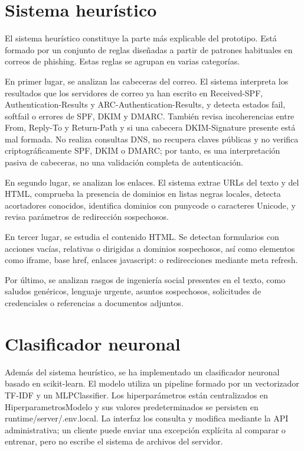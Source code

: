 \documentclass[11pt,a4paper,oneside]{report}
\begin{document}
\section{Sistema heurístico}

El sistema heurístico constituye la parte más explicable del prototipo. Está formado por un conjunto de reglas diseñadas a partir de patrones habituales en correos de phishing. Estas reglas se agrupan en varias categorías.

En primer lugar, se analizan las cabeceras del correo. El sistema interpreta los resultados que los servidores de correo ya han escrito en Received-SPF, Authentication-Results y ARC-Authentication-Results, y detecta estados fail, softfail o errores de SPF, DKIM y DMARC. También revisa incoherencias entre From, Reply-To y Return-Path y si una cabecera DKIM-Signature presente está mal formada. No realiza consultas DNS, no recupera claves públicas y no verifica criptográficamente SPF, DKIM o DMARC; por tanto, es una interpretación pasiva de cabeceras, no una validación completa de autenticación.

En segundo lugar, se analizan los enlaces. El sistema extrae URLs del texto y del HTML, comprueba la presencia de dominios en listas negras locales, detecta acortadores conocidos, identifica dominios con punycode o caracteres Unicode, y revisa parámetros de redirección sospechosos.

En tercer lugar, se estudia el contenido HTML. Se detectan formularios con acciones vacías, relativas o dirigidas a dominios sospechosos, así como elementos como iframe, base href, enlaces javascript: o redirecciones mediante meta refresh.

Por último, se analizan rasgos de ingeniería social presentes en el texto, como saludos genéricos, lenguaje urgente, asuntos sospechosos, solicitudes de credenciales o referencias a documentos adjuntos.

\section{Clasificador neuronal}

Además del sistema heurístico, se ha implementado un clasificador neuronal basado en scikit-learn. El modelo utiliza un pipeline formado por un vectorizador TF-IDF y un MLPClassifier. Los hiperparámetros están centralizados en HiperparametrosModelo y sus valores predeterminados se persisten en runtime/server/.env.local. La interfaz los consulta y modifica mediante la API administrativa; un cliente puede enviar una excepción explícita al comparar o entrenar, pero no escribe el sistema de archivos del servidor.
\end{document}
